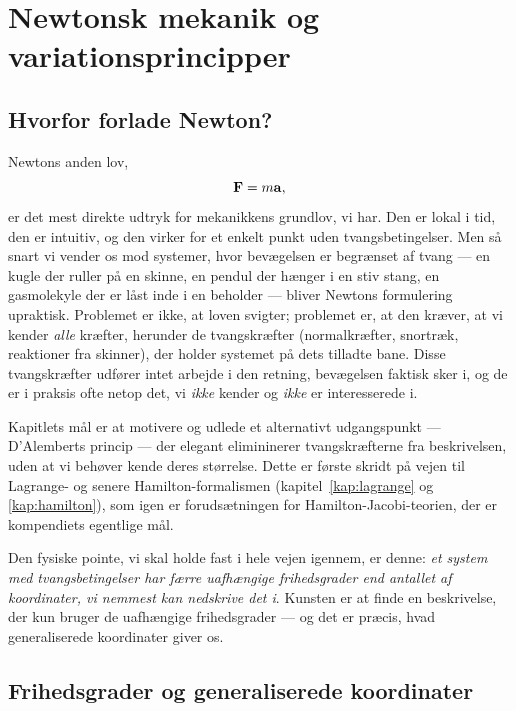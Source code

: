 
\chapter{Newtonsk mekanik og variationsprincipper}
\label{kap:newton-variation}

\section{Hvorfor forlade Newton?}

Newtons anden lov,
\begin{equation}
  \vb{F} = m\vb{a},
\end{equation}
er det mest direkte udtryk for mekanikkens grundlov, vi har. Den er lokal
i tid, den er intuitiv, og den virker for et enkelt punkt uden
tvangsbetingelser. Men så snart vi vender os mod systemer, hvor
bevægelsen er begrænset af tvang — en kugle der ruller på en skinne, en
pendul der hænger i en stiv stang, en gasmolekyle der er låst inde i en
beholder — bliver Newtons formulering upraktisk. Problemet er ikke, at
loven svigter; problemet er, at den kræver, at vi kender \emph{alle}
kræfter, herunder de tvangskræfter (normalkræfter, snortræk, reaktioner
fra skinner), der holder systemet på dets tilladte bane. Disse
tvangskræfter udfører intet arbejde i den retning, bevægelsen faktisk
sker i, og de er i praksis ofte netop det, vi \emph{ikke} kender og
\emph{ikke} er interesserede i.

Kapitlets mål er at motivere og udlede et alternativt udgangspunkt —
D'Alemberts princip — der elegant elimininerer tvangskræfterne fra
beskrivelsen, uden at vi behøver kende deres størrelse. Dette er første
skridt på vejen til Lagrange- og senere Hamilton-formalismen
(kapitel~\ref{kap:lagrange} og \ref{kap:hamilton}), som igen er
forudsætningen for Hamilton-Jacobi-teorien, der er kompendiets egentlige
mål.

Den fysiske pointe, vi skal holde fast i hele vejen igennem, er denne:
\emph{et system med tvangsbetingelser har færre uafhængige
frihedsgrader end antallet af koordinater, vi nemmest kan nedskrive
det i}. Kunsten er at finde en beskrivelse, der kun bruger de
uafhængige frihedsgrader — og det er præcis, hvad generaliserede
koordinater giver os.

\section{Frihedsgrader og generaliserede koordinater}

